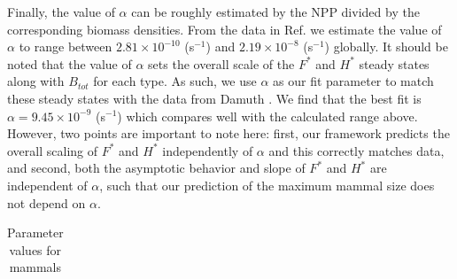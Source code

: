 \documentclass[twocolumn,preprintnumbers,amsmath,amssymb,superscriptaddress]{revtex4}
\begin{document}
\begin{bibunit}[unsrt]
Finally, the value of $\alpha$ can be roughly estimated by the NPP divided by the corresponding biomass densities. From the data in Ref. \citep{michaletz2014convergence} we estimate the value of $\alpha$ to range between $2.81\times10^{-10}$ (s$^{-1}$) and $2.19\times10^{-8}$ (s$^{-1}$) globally. It should be noted that the value of $\alpha$ sets the overall scale of the $F^{*}$ and $H^{*}$ steady states along with $B_{tot}$ for each type. As such, we use $\alpha$ as our fit parameter to match these steady states with the data from Damuth \citep{damuth1987interspecific}. We find that the best fit is $\alpha=9.45\times10^{-9}$ (s$^{-1}$) which compares well with the calculated range above. However, two points are important to note here: first, our framework predicts the overall scaling of $F^{*}$ and $H^{*}$ independently of $\alpha$ and this correctly matches data, and second, both the asymptotic behavior and slope of $F^{*}$ and $H^{*}$ are independent of $\alpha$, such that our prediction of the maximum mammal size does not depend on $\alpha$.
\\





 \begin{table}[h]
\caption{Parameter values for mammals}
\label{param}
    \begin{center}
    \footnotesize
     \begin{tabular}{p{3.8cm} c p{2.2cm} p{1.4cm}}
     \hline
    

\end{tabular}
\end{center}
\end{table}
\end{bibunit}
\end{document}
